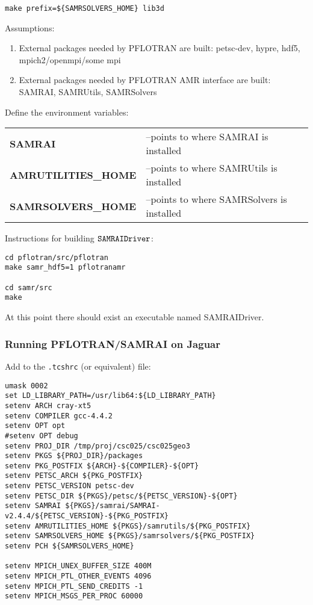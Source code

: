 \documentclass[12pt]{article}
\begin{document}
\verb|make prefix=${SAMRSOLVERS_HOME} lib3d|

\noindent
Assumptions:
\begin{enumerate}
\item External packages needed by PFLOTRAN are built: petsc-dev, hypre,  
hdf5, \linebreak mpich2/openmpi/some mpi
\item External packages needed by PFLOTRAN AMR interface are built:  
SAMRAI, SAMRUtils, SAMRSolvers
\end{enumerate}

\noindent
Define the environment variables:
\begin{center}
\begin{tabularx}{\linewidth}{lX}
\bf SAMRAI &--points to where SAMRAI is installed\\
\bf AMRUTILITIES\_HOME &--points to where SAMRUtils is installed\\
\bf SAMRSOLVERS\_HOME &--points to where SAMRSolvers is installed
\end{tabularx}
\end{center}

\noindent
Instructions for building $\verb|SAMRAIDriver|$:
\begin{center}
\begin{verbatim}
cd pflotran/src/pflotran
make samr_hdf5=1 pflotranamr

cd samr/src
make
\end{verbatim}
\end{center}

\noindent
At this point there should exist an executable named SAMRAIDriver.

\subsubsection{Running PFLOTRAN/SAMRAI on Jaguar}

Add to the {\tt .tcshrc} (or equivalent) file:
\begin{verbatim}
umask 0002
set LD_LIBRARY_PATH=/usr/lib64:${LD_LIBRARY_PATH}
setenv ARCH cray-xt5
setenv COMPILER gcc-4.4.2
setenv OPT opt
#setenv OPT debug 
setenv PROJ_DIR /tmp/proj/csc025/csc025geo3
setenv PKGS ${PROJ_DIR}/packages
setenv PKG_POSTFIX ${ARCH}-${COMPILER}-${OPT}
setenv PETSC_ARCH ${PKG_POSTFIX} 
setenv PETSC_VERSION petsc-dev
setenv PETSC_DIR ${PKGS}/petsc/${PETSC_VERSION}-${OPT}
setenv SAMRAI ${PKGS}/samrai/SAMRAI-v2.4.4/${PETSC_VERSION}-${PKG_POSTFIX}
setenv AMRUTILITIES_HOME ${PKGS}/samrutils/${PKG_POSTFIX}
setenv SAMRSOLVERS_HOME ${PKGS}/samrsolvers/${PKG_POSTFIX}
setenv PCH ${SAMRSOLVERS_HOME} 
 
setenv MPICH_UNEX_BUFFER_SIZE 400M
setenv MPICH_PTL_OTHER_EVENTS 4096
setenv MPICH_PTL_SEND_CREDITS -1
setenv MPICH_MSGS_PER_PROC 60000
\end{verbatim}
\end{document}
